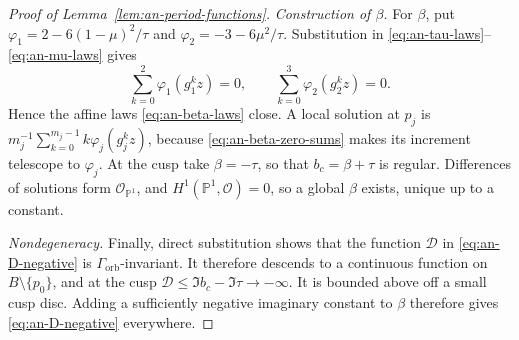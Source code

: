 \documentclass[11pt]{article}
\theoremstyle{definition}
\theoremstyle{remark}
\numberwithin{equation}{section}
\newcommand{\PP}{\mathbb P}
\newcommand{\cO}{\mathcal O}
\begin{document}
\begin{proof}[Proof of Lemma~\ref{lem:an-period-functions}]
\smallskip
\noindent\emph{Construction of $\beta$.}
For $\beta$, put $\varphi_1=2-6(1-\mu)^2/\tau$ and
$\varphi_2=-3-6\mu^2/\tau$.
Substitution in \eqref{eq:an-tau-laws}--\eqref{eq:an-mu-laws} gives
\begin{equation}\label{eq:an-beta-zero-sums}
 \sum_{k=0}^{2}\varphi_1(g_1^kz)=0,
 \qquad
 \sum_{k=0}^{3}\varphi_2(g_2^kz)=0.
\end{equation}
Hence the affine laws \eqref{eq:an-beta-laws} close.  A local solution at
$p_j$ is $m_j^{-1}\sum_{k=0}^{m_j-1}k\varphi_j(g_j^kz)$,
because \eqref{eq:an-beta-zero-sums} makes its increment telescope to
$\varphi_j$.  At the cusp take $\beta=-\tau$, so that
$b_c=\beta+\tau$ is regular.  Differences of solutions form
$\cO_{\PP^1}$, and $H^1(\PP^1,\cO)=0$, so a global $\beta$ exists,
unique up to a constant.

\smallskip
\noindent\emph{Nondegeneracy.}
Finally, direct substitution shows that the function $\mathcal D$ in
\eqref{eq:an-D-negative} is
$\Gamma_{\mathrm{orb}}$-invariant.  It therefore descends to a continuous
function on $B\setminus\{p_0\}$, and at the cusp
$\mathcal D\leq \Im b_c-\Im\tau\to-\infty$.
It is bounded above off a small cusp disc.  Adding a sufficiently negative
imaginary constant to $\beta$ therefore gives
\eqref{eq:an-D-negative} everywhere.
\end{proof}




\end{document}
